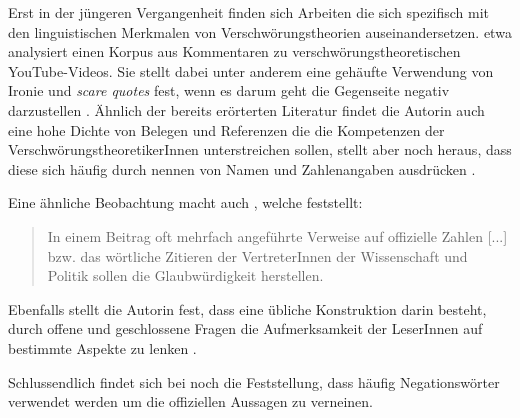 Erst in der jüngeren Vergangenheit finden sich Arbeiten die sich spezifisch mit den linguistischen Merkmalen von Verschwörungstheorien auseinandersetzen.
\textcite{schafer_2018} etwa analysiert einen Korpus aus Kommentaren zu verschwörungstheoretischen YouTube-Videos.
Sie stellt dabei unter anderem eine gehäufte Verwendung von Ironie und \textit{scare quotes} fest, wenn es darum geht die Gegenseite negativ darzustellen \parencite[235]{schafer_2018}.
Ähnlich der bereits erörterten Literatur findet die Autorin auch eine hohe Dichte von Belegen und Referenzen die die Kompetenzen der VerschwörungstheoretikerInnen unterstreichen sollen, stellt aber noch heraus, dass diese sich häufig durch nennen von Namen und Zahlenangaben ausdrücken \parencite[234]{schafer_2018}.

Eine ähnliche Beobachtung macht auch \textcite{filatkina_2018}, welche feststellt:

\begin{quotation}
    In einem Beitrag oft mehrfach angeführte Verweise auf offizielle Zahlen [...] bzw. das wörtliche Zitieren der VertreterInnen der Wissenschaft und Politik sollen die Glaubwürdigkeit herstellen. \parencite[][208]{filatkina_2018}
\end{quotation}

Ebenfalls stellt die Autorin fest, dass eine übliche Konstruktion darin besteht, durch offene und geschlossene Fragen die Aufmerksamkeit der LeserInnen auf bestimmte Aspekte zu lenken \parencite[][205]{filatkina_2018}.

Schlussendlich findet sich bei \textcite[149]{stumpf_2019} noch die Feststellung, dass häufig Negationswörter verwendet werden um die offiziellen Aussagen zu verneinen.


